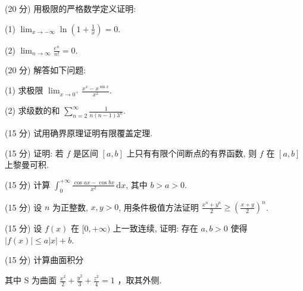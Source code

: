 (20 分) 用极限的严格数学定义证明:\par
(1) $\lim_{x\to -\infty}\ln \left(1 + \frac{1}{x}\right) = 0.$\par
(2) $\lim_{n\to \infty}\frac{e^n}{n!} = 0.$\par
(20 分) 解答如下问题:\par
(1) 求极限 $\lim_{x\to 0^{+}}\frac{x^x - x^{\sin x}}{x^2}.$\par
(2) 求级数的和 $\sum_{n=2}^{\infty} \frac{1}{n(n-1)3^n}$.\par
(15 分) 试用确界原理证明有限覆盖定理.\par
(15 分) 证明: 若 $f$ 是区间 $[a, b]$ 上只有有限个间断点的有界函数, 则 $f$ 在 $[a, b]$ 上黎曼可积.\par
(15 分) 计算 $\int_0^{+\infty} \frac{\cos ax - \cos bx}{x^2} \, \mathrm{d}x$, 其中 $b > a > 0$.\par
(15 分) 设 $n$ 为正整数, $x, y > 0$, 用条件极值方法证明 $\frac{x^n + y^n}{2} \geq \left(\frac{x + y}{2}\right)^n$.\par
(15 分) 设 $f(x)$ 在 $[0, +\infty)$ 上一致连续, 证明: 存在 $a, b > 0$ 使得 $|f(x)| \leq a|x| + b$.\par
\par{}
(15 分) 计算曲面积分\par
\nopagebreak[4]
其中 S 为曲面  $\frac{x^{2}}{2} + \frac{y^{2}}{3} + \frac{z^{2}}{4} = 1$ ，取其外侧.\par
